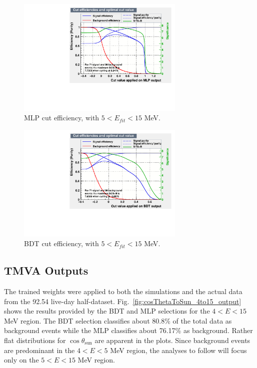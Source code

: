 \begin{figure}[!htb]
	\centering
	\includegraphics[width=8cm]{cutEfficiencyMLP.pdf}
	\caption[MLP cut efficiency, with $5<E_{fit}<15$ MeV.]{MLP cut efficiency, with $5<E_{fit}<15$ MeV. \label{fig:TMVAcutEffiencyMLP}}
\end{figure}

\begin{figure}[!htb]
	\centering
	\includegraphics[width=8cm]{cutEfficiencyBDT.pdf}
	\caption[BDT cut efficiency, with $5<E_{fit}<15$ MeV.]{BDT cut efficiency, with $5<E_{fit}<15$ MeV.\label{fig:TMVAcutEffiencyBDT}}
\end{figure}

\subsection{TMVA Outputs}\label{sect:tmvaOutput}

The trained weights were applied to both the simulations and the actual data from the 92.54 live-day half-dataset.  Fig.~\ref{fig:cosThetaToSun_4to15_output} shows the results provided by the BDT and MLP selections for the $4<E<15$ MeV region. The BDT selection classifies about 80.8\% of the total data as background events while the MLP classifies about 76.17\% as background. Rather flat distributions for $\cos\theta_\mathrm{sun}$ are apparent in the plots. Since background events are predominant in the $4<E<5$ MeV region, the analyses to follow will focus only on the $5<E<15$ MeV region.

